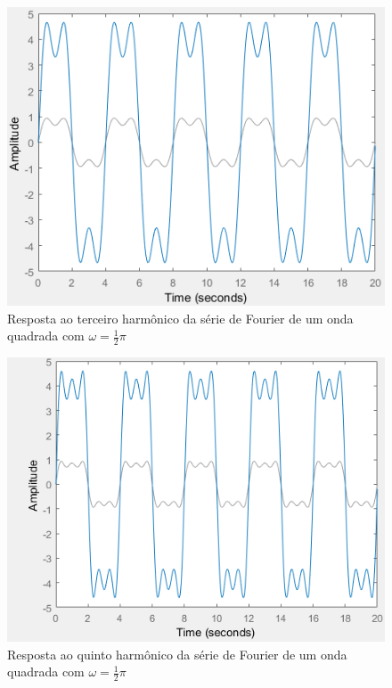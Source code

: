 \documentclass[a4paper, 12pt]{article}
\begin{document}
			\begin{figure}[!ht]
				\centering
				\includegraphics[scale=0.71]{img/2j.png}
				\caption{Resposta ao terceiro harmônico da série de Fourier de um onda quadrada com $\omega = \frac{1}{2}\pi$}	
			\end{figure}			
			\begin{figure}[!ht]
				\centering
				\includegraphics[scale=0.71]{img/2k.png}
				\caption{Resposta ao quinto harmônico da série de Fourier de um onda quadrada com $\omega = \frac{1}{2}\pi$}	
			\end{figure}		
\end{document}
